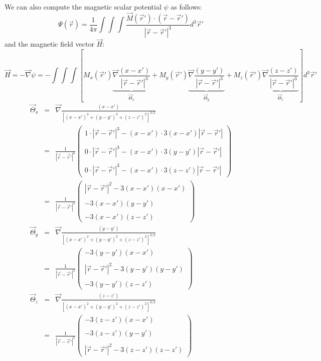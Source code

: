 We can also compute the magnetic scalar potential $\psi$ as follows:
\[
\Psi (\vec r)= \frac{1}{4\pi} \int\int\int \frac{{\vec M}({\vec r}') \cdot ({\vec r}-{\vec r}')}{|{\vec r}-{\vec r}'|^3} 
d^3{\vec r}'
\]
and the magnetic field vector $\vec H$:
\[
\vec H = -\vec\nabla \psi = 
- \int\int\int 
\left[
 M_x({\vec r}') \underbrace{\vec\nabla \frac{ (x-x')}{|{\vec r}-{\vec r}'|^3}}_{\vec\Theta_x} +   
 M_y({\vec r}') \underbrace{\vec\nabla \frac{ (y-y')}{|{\vec r}-{\vec r}'|^3}}_{\vec\Theta_y} +   
 M_z({\vec r}') \underbrace{\vec\nabla \frac{ (z-z')}{|{\vec r}-{\vec r}'|^3}}_{\vec\Theta_z}    
\right] 
d^3{\vec r}'
\]
\begin{eqnarray}
\vec\Theta_x 
&=& \vec\nabla \frac{ (x-x')}{ [(x-x')^2+(y-y')^2+(z-z')^2]^{3/2}   } \\
&=&
\frac{1}{|{\vec r}-{\vec r}'|^6}
\left(\begin{array}{c}
1 \cdot |{\vec r}-{\vec r}'|^3 - (x-x') \cdot 3 (x-x') |{\vec r}-{\vec r}'| \\ \\
0 \cdot |{\vec r}-{\vec r}'|^3 - (x-x') \cdot 3 (y-y') |{\vec r}-{\vec r}'| \\ \\
0 \cdot |{\vec r}-{\vec r}'|^3 - (x-x') \cdot 3 (z-z') |{\vec r}-{\vec r}'| 
\end{array}\right) \\
&=& 
\frac{1}{|{\vec r}-{\vec r}'|^5}
\left(\begin{array}{c}
|{\vec r}-{\vec r}'|^2 - 3(x-x') (x-x')  \\ \\
- 3(x-x')(y-y')  \\ \\
- 3(x-x')(z-z')  
\end{array}\right) \\ 
\vec\Theta_y 
&=& \vec\nabla \frac{ (y-y')}{ [(x-x')^2+(y-y')^2+(z-z')^2]^{3/2}   } \\
&=& 
\frac{1}{|{\vec r}-{\vec r}'|^5}
\left(\begin{array}{c}
- 3(y-y') (x-x')  \\ \\
|{\vec r}-{\vec r}'|^2 - 3(y-y')(y-y')  \\ \\
- 3(y-y')(z-z')  
\end{array}\right) \\ 
\vec\Theta_z 
&=& \vec\nabla \frac{ (z-z')}{ [(x-x')^2+(y-y')^2+(z-z')^2]^{3/2}   } \\
&=& 
\frac{1}{|{\vec r}-{\vec r}'|^5}
\left(\begin{array}{c}
- 3(z-z') (x-x')  \\ \\
- 3(z-z')(y-y')  \\ \\
|{\vec r}-{\vec r}'|^2 - 3(z-z')(z-z')  
\end{array}\right) \\ 
\end{eqnarray}



